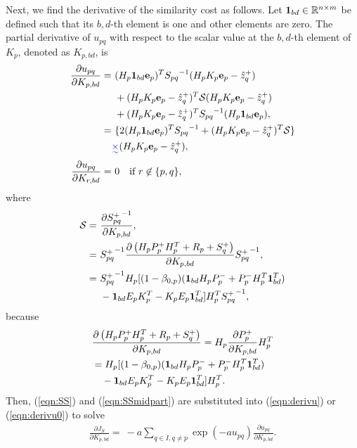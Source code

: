 \documentclass[letterpaper, 10pt, conference]{ieeeconf}
\newcommand{\refeqn}[1]{(\ref{eqn:#1})}
\newcommand{\deriv}[2]{\ensuremath{\frac{\partial #1}{\partial #2}}}
\renewcommand{\Re}{\ensuremath{\mathbb{R}}}
\providecommand{\DIFadd}[1]{{\protect\color{blue}\uwave{#1}}} %
\providecommand{\DIFaddbegin}{} %
\providecommand{\DIFaddend}{} %
\providecommand{\DIFdelbegin}{} %
\providecommand{\DIFdelend}{} %
\begin{document}
Next, we find the derivative of the similarity cost as follows.
Let $\Ibd\in \Re^{n\times m}$ be defined such that its $b,d$-th element is one and other elements are zero.
The partial derivative of $u_{pq}$ with respect to the scalar value at the $b,d$-th element of $K_p$, denoted as $K_{p,bd}$, is
\begin{align}
\deriv{u_{pq}}{K_{p,bd}}
=&\ 
(H_p\Ibd{\bf e}_p)^T
{S_{pq}}^{-1}
(H_pK_p{\bf e}_p-\hat z^+_{q})\nonumber
\\
&\ +
(H_pK_p{\bf e}_p-\hat z^+_{q})^T
\mathcal{S}
(H_pK_p{\bf e}_p-\hat z^+_{q})\nonumber
\\
&\ +
(H_pK_p{\bf e}_p-\hat z^+_{q})^T
{S_{pq}}^{-1}
(H_p\Ibd{\bf e}_p),\nonumber
\\
=&\ \{
2(H_p\Ibd{\bf e}_p)^T
{S_{pq}}^{-1} \DIFdelbegin %
\DIFdelend +(H_pK_p{\bf e}_p-\hat z^+_{q})^T
\mathcal{S}
\}\DIFaddbegin \nonumber\\
&\DIFadd{\times }\DIFaddend (H_pK_p{\bf e}_p-\hat z^+_{q}),\label{eqn:derivu}
\\
\deriv{u_{pq}}{K_{r,bd}}=&\ 0\quad \mbox{if } r\not\in\{p,q\},\label{eqn:derivu0}
\end{align}
where
\begin{align}
\mathcal{S}=&\ \deriv{{S^+_{pq}}^{-1}}{K_{p,bd}},\nonumber
\\
=&\ {S^+_{pq}}^{-1}
\deriv{\left(H_pP^+_{p}H_p^T+R_p+S^+_q\right)}{K_{p,bd}}
{S^+_{pq}}^{-1},\nonumber
\\
=&\ {S^+_{pq}}^{-1}
H_p
[(1-\beta_{0,p})(\Ibd H_pP_p^-+P_p^-H_p^T\Ibd^T)\nonumber
\\
&\ -\Ibd E_pK_p^T -K_pE_p\Ibd^T]
H_p^T
{S^+_{pq}}^{-1},\label{eqn:SS}
\end{align}
because
\begin{align}
&\deriv{\left(H_pP^+_{p}H_p^T+R_p+S^+_q\right)}{K_{p,bd}}
=
H_p
\deriv{P^+_{p}}{K_{p,bd}}
H_p^T\nonumber
\\
&=
H_p
[(1-\beta_{0,p})(\Ibd H_pP_p^-+P_p^-H_p^T\Ibd^T)\nonumber
\\
&\ \ \ -\Ibd E_pK_p^T -K_pE_p\Ibd^T]
H_p^T.\label{eqn:SSmidpart}
\end{align}
Then, \refeqn{SS} and \refeqn{SSmidpart} are substituted into \refeqn{derivu} or \refeqn{derivu0} to solve
\begin{align}
\label{eqn:JSK}
\deriv{J_S}{K_{p,bd}}=\ -a\sum\limits_{q\in I,q\neq p}\exp (-au_{pq})\deriv{u_{pq}}{K_{p,bd}}.
\end{align}
\end{document}
